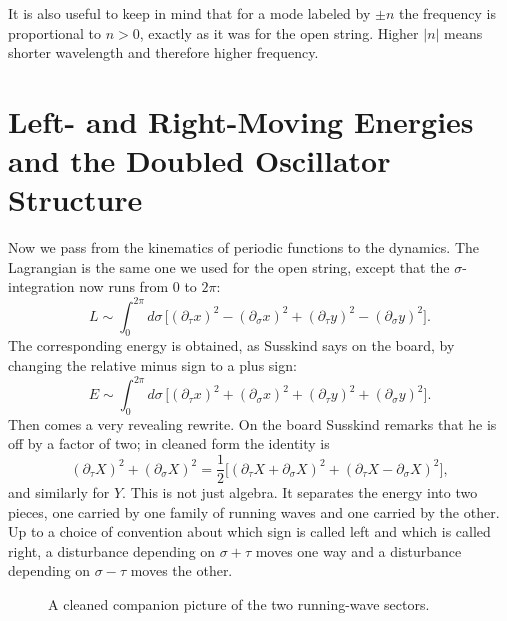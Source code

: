 It is also useful to keep in mind that for a mode labeled by \(\pm n\) the frequency is proportional to \(n>0\), exactly as it was for the open string. Higher \(|n|\) means shorter wavelength and therefore higher frequency.

\section{Left- and Right-Moving Energies and the Doubled Oscillator Structure}

Now we pass from the kinematics of periodic functions to the dynamics. The Lagrangian is the same one we used for the open string, except that the \(\sigma\)-integration now runs from \(0\) to \(2\pi\):
\begin{equation}
L\sim \int_0^{2\pi} d\sigma\,
\Big[
(\partial_\tau x)^2-(\partial_\sigma x)^2
+
(\partial_\tau y)^2-(\partial_\sigma y)^2
\Big].
\end{equation}
The corresponding energy is obtained, as Susskind says on the board, by changing the relative minus sign to a plus sign:
\begin{equation}
E\sim \int_0^{2\pi} d\sigma\,
\Big[
(\partial_\tau x)^2+(\partial_\sigma x)^2
+
(\partial_\tau y)^2+(\partial_\sigma y)^2
\Big].
\end{equation}
Then comes a very revealing rewrite. On the board Susskind remarks that he is off by a factor of two; in cleaned form the identity is
\begin{equation}
(\partial_\tau X)^2+(\partial_\sigma X)^2
=
\frac12
\Big[
(\partial_\tau X+\partial_\sigma X)^2
+
(\partial_\tau X-\partial_\sigma X)^2
\Big],
\end{equation}
and similarly for \(Y\). This is not just algebra. It separates the energy into two pieces, one carried by one family of running waves and one carried by the other. Up to a choice of convention about which sign is called left and which is called right, a disturbance depending on \(\sigma+\tau\) moves one way and a disturbance depending on \(\sigma-\tau\) moves the other.

\begin{figure}[t]
\centering
{}
\caption{A cleaned companion picture of the two running-wave sectors.}
\end{figure}

